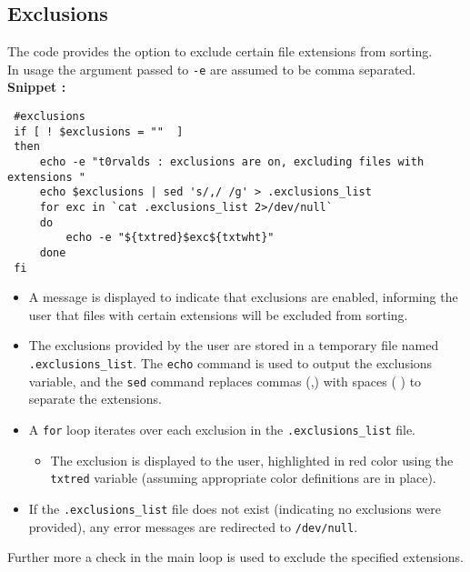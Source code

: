 \documentclass[12pt]{article}
\begin{document}
    \subsection{Exclusions}
    \begin{flushleft}
    The code provides the option to exclude certain file extensions from sorting.\\
    In usage the argument passed to \texttt{-e} are assumed to be comma separated.
    \\\textbf{Snippet :}
    \begin{verbatim}
 #exclusions
 if [ ! $exclusions = ""  ]
 then
     echo -e "t0rvalds : exclusions are on, excluding files with extensions "
     echo $exclusions | sed 's/,/ /g' > .exclusions_list
     for exc in `cat .exclusions_list 2>/dev/null`
     do
         echo -e "${txtred}$exc${txtwht}"
     done
 fi
    \end{verbatim}
    \begin{itemize}
    \item A message is displayed to indicate that exclusions are enabled, informing the user that files with certain extensions will be excluded from sorting.
    \item The exclusions provided by the user are stored in a temporary file named \texttt{.exclusions\_list}. The \texttt{echo} command is used to output the exclusions variable, and the \texttt{sed} command replaces commas (,) with spaces ( ) to separate the extensions.
    \item A \texttt{for} loop iterates over each exclusion in the \texttt{.exclusions\_list} file.
        \begin{itemize}
            \item The exclusion is displayed to the user, highlighted in red color using the \texttt{txtred} variable (assuming appropriate color definitions are in place).
        \end{itemize}
    \item If the \texttt{.exclusions\_list} file does not exist (indicating no exclusions were provided), any error messages are redirected to \texttt{/dev/null}.
    \end{itemize}
    Further more a check in the main loop is used to exclude the specified extensions.
    \end{flushleft}
\end{document}
